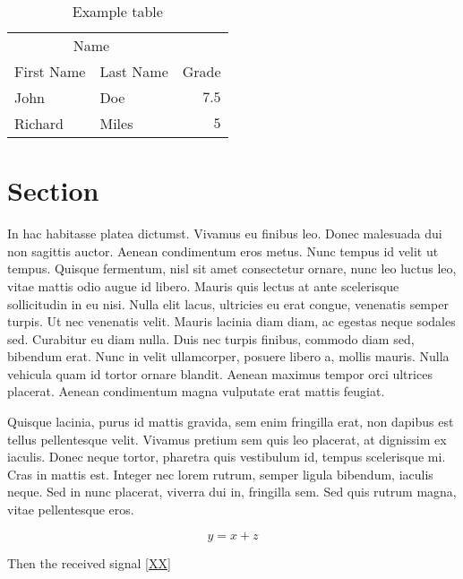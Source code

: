 \documentclass[10pt, a4paper, twocolumn, utf8]{article}
\begin{document}
\begin{table}
	\caption{Example table}
	\centering
	\begin{tabular}{llr}
		\toprule
		\multicolumn{2}{c}{Name} \\
		\cmidrule(r){1-2}
		First Name & Last Name & Grade \\
		\midrule
		John & Doe & $7.5$ \\
		Richard & Miles & $5$ \\
		\bottomrule
	\end{tabular}
\end{table}


\section{Section}


In hac habitasse platea dictumst. Vivamus eu finibus leo. Donec malesuada dui non sagittis auctor. Aenean condimentum eros metus. Nunc tempus id velit ut tempus. Quisque fermentum, nisl sit amet consectetur ornare, nunc leo luctus leo, vitae mattis odio augue id libero. Mauris quis lectus at ante scelerisque sollicitudin in eu nisi. Nulla elit lacus, ultricies eu erat congue, venenatis semper turpis. Ut nec venenatis velit. Mauris lacinia diam diam, ac egestas neque sodales sed. Curabitur eu diam nulla. Duis nec turpis finibus, commodo diam sed, bibendum erat. Nunc in velit ullamcorper, posuere libero a, mollis mauris. Nulla vehicula quam id tortor ornare blandit. Aenean maximus tempor orci ultrices placerat. Aenean condimentum magna vulputate erat mattis feugiat.

Quisque lacinia, purus id mattis gravida, sem enim fringilla erat, non dapibus est tellus pellentesque velit. Vivamus pretium sem quis leo placerat, at dignissim ex iaculis. Donec neque tortor, pharetra quis vestibulum id, tempus scelerisque mi. Cras in mattis est. Integer nec lorem rutrum, semper ligula bibendum, iaculis neque. Sed in nunc placerat, viverra dui in, fringilla sem. Sed quis rutrum magna, vitae pellentesque eros.

\begin{strip}

	\begin{equation}
		y=x+z \label{XX}
	\end{equation}

	Then the received signal \eqref{XX}
	
\end{strip}
\end{document}

